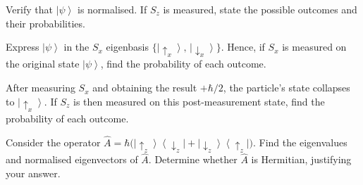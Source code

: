 \documentclass[12pt,a4paper]{article}
\renewcommand{\ket}[1]{\left|#1\right\rangle}
\renewcommand{\ketbra}[2]{\left|#1\right\rangle\!\left\langle #2\right|}
\begin{document}
\begin{parts}
\item Verify that $\ket{\psi}$ is normalised. If $S_z$ is measured, state the possible outcomes and their probabilities. 

\item Express $\ket{\psi}$ in the $S_x$ eigenbasis $\{\ket{\!\uparrow_x},\, \ket{\!\downarrow_x}\}$. Hence, if $S_x$ is measured on the original state $\ket{\psi}$, find the probability of each outcome. 

\item After measuring $S_x$ and obtaining the result $+\hbar/2$, the particle's state collapses to $\ket{\!\uparrow_x}$. If $S_z$ is then measured on this post-measurement state, find the probability of each outcome. 

\item Consider the operator $\hat{A} = \hbar\bigl(\ketbra{\!\uparrow_z}{\downarrow_z\!} + \ketbra{\!\downarrow_z}{\uparrow_z\!}\bigr)$. Find the eigenvalues and normalised eigenvectors of $\hat{A}$. Determine whether $\hat{A}$ is Hermitian, justifying your answer. 
\end{parts}

\newpage


\end{document}
